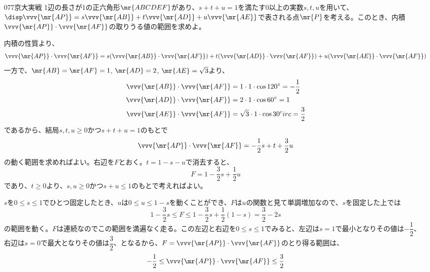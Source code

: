 \begin{prob}{077}{}{京大実戦}
 1辺の長さが1の正六角形$\mr{ABCDEF}$があり、$s+t+u=1$を満たす0以上の実数$s, t, u$を用いて、$\disp \vvv{\mr{AP}}=s\vvv{\mr{AB}}+t\vvv{\mr{AD}}+u\vvv{\mr{AE}}$で表される点$\mr{P}$を考える。このとき、内積$\vvv{\mr{AP}}\cdot\vvv{\mr{AF}}$の取りうる値の範囲を求めよ。
\end{prob}

内積の性質より、
\[ \vvv{\mr{AP}}\cdot\vvv{\mr{AF}}=s(\vvv{\mr{AB}}\cdot\vvv{\mr{AF}})+t(\vvv{\mr{AD}}\cdot\vvv{\mr{AF}})+u(\vvv{\mr{AE}}\cdot\vvv{\mr{AF}}) \]
一方で、$\mr{AB}=\mr{AF}=1$, $\mr{AD}=2$, $\mr{AE}=\sqrt{3}$より、
\begin{align*}
 \vvv{\mr{AB}}\cdot\vvv{\mr{AF}}&=1\cdot 1\cdot \cos 120^\circ=-\frac{1}{2} \\
 \vvv{\mr{AD}}\cdot\vvv{\mr{AF}}&=2\cdot 1\cdot \cos 60^\circ=1 \\
 \vvv{\mr{AE}}\cdot\vvv{\mr{AF}}&=\sqrt{3}\cdot 1\cdot \cos 30^circ=\frac{3}{2}
\end{align*}
であるから、結局$s, t, u\ge 0$かつ$s+t+u=1$のもとで
\[ \vvv{\mr{AP}}\cdot\vvv{\mr{AF}}=-\frac{1}{2}s+t+\frac{3}{2}u \]
の動く範囲を求めればよい。右辺を$F$とおく。$t=1-s-u$で消去すると、
\[ F=1-\frac{3}{2}s+\frac{1}{2}u \]
であり、$t\ge 0$より、$s, u\ge 0$かつ$s+u\le 1$のもとで考えればよい。

$s$を$0\le s\le 1$でひとつ固定したとき、$u$は$0\le u\le 1-s$を動くことができ、$F$は$u$の関数と見て単調増加なので、$s$を固定した上では
\[ 1-\frac{3}{2}s\le F\le 1-\frac{3}{2}s+\frac{1}{2}(1-s) = \frac{3}{2}-2s \]
の範囲を動く。$F$は連続なのでこの範囲を満遍なく走る。この左辺と右辺を$0\le s\le 1$でみると、左辺は$s=1$で最小となりその値は$-\dfrac{1}{2}$、右辺は$s=0$で最大となりその値は$\dfrac{3}{2}$、となるから、$F=\vvv{\mr{AP}}\cdot\vvv{\mr{AF}}$のとり得る範囲は、
\[ -\frac{1}{2}\le \vvv{\mr{AP}}\cdot\vvv{\mr{AF}}\le \frac{3}{2} \]